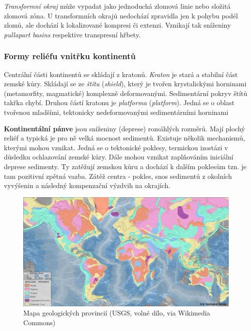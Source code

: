 \emph{Transformní okraj} může vypadat jako jednoduchá zlomová linie nebo složitá zlomová zóna. U transformních okrajů nedochází zpravidla jen k pohybu podél zlomů, ale dochází k lokalizované kompresi či extenzi. Vznikají tak sníženiny \textit{pullapart basins} respektive transpresní hřbety.

\subsubsection{Formy reliéfu vnitřku kontinentů}
Centrální části kontinentů se skládají z kratonů. \emph{Kraton} je stará a stabilní část zemské kůry. Skládají se ze \emph{štítu} (\textit{shield}), který je tvořen krystalickými horninami (metamorfity, magmatické) komplexně deformovanými. Sedimentární pokryv štítů takřka chybí. Druhou částí kratonu je \emph{platforma} (\textit{platform}). Jedná se o oblast tvořenou mladšími, tektonicky nedeformovanými sedimentárními horninami 

\textbf{Kontinentální pánve} jsou sníženiny (deprese) rozsáhlých rozměrů. Mají plochý reliéf a typická je pro ně velká mocnost sedimentů. Existuje několik mechanismů, kterými mohou vznikat. Jedná se o tektonické poklesy, termickou izostázi v důsledku ochlazování zemské kůry. Dále mohou vznikat zaplňováním iniciální deprese sedimenty. Ty zatěžují zemskou kůru a dochází k dalším poklesům tzn. je tam pozitivní zpětná vazba. Zátěž centra - pokles, snos sedimentů z okolních vyvýšenin a následný kompenzační výzdvih na okrajích.

\begin{figure}
	\centering
	\includegraphics[width=1\linewidth]{obrazky/tectonic/World_geologic_provinces}
	\caption{Mapa geologických provincií (USGS, volné dílo, via Wikimedia Commons)}
	\label{fig:worldgeologicprovinces}
\end{figure}

%		
%
%	
